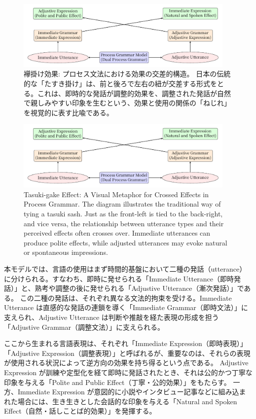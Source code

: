 \documentclass[a4paper,xelatex,ja=standard]{bxjsarticle}
\begin{document}
\ifJPN
  \begin{figure}[htb]\centering\small
    \includegraphics[width=0.95\textwidth]{tasuki-gake.pdf}
    \caption{襷掛け効果: プロセス文法における効果の交差的構造。
    日本の伝統的な「たすき掛け」は、前と後ろで左右の紐が交差する形式をとる。これは、即時的な発話が調整的効果を、調整された発話が自然で親しみやすい印象を生むという、効果と使用の関係の「ねじれ」を視覚的に表す比喩である。
    }\label{fig:tasuki-gake}
  \end{figure}
\else
  \begin{figure}[htb]\centering\small
    \includegraphics[width=0.95\textwidth]{tasuki-gake.pdf}
    \caption{Tasuki-gake Effect: A Visual Metaphor for Crossed Effects in Process Grammar. The diagram illustrates the traditional way of tying a tasuki sash. Just as the front-left is tied to the back-right, and vice versa, the relationship between utterance types and their perceived effects often crosses over. Immediate utterances can produce polite effects, while adjusted utterances may evoke natural or spontaneous impressions.
    }\label{fig:tasuki-gake}
  \end{figure}
\fi

\ifJPN
本モデルでは、言語の使用はまず時間的基盤において二種の発話（utterance）に分けられる。すなわち、即時に発せられる「Immediate Utterance（即時発話）」と、熟考や調整の後に発せられる「Adjustive Utterance（漸次発話）」である。
この二種の発話は、それぞれ異なる文法的拘束を受ける。Immediate Utterance は直感的な発話の連鎖を導く「Immediate Grammar（即時文法）」に支えられ、Adjustive Utterance は判断や推敲を経た表現の形成を担う「Adjustive Grammar（調整文法）」に支えられる。

ここから生まれる言語表現は、それぞれ「Immediate Expression（即時表現）」「Adjustive Expression（調整表現）」と呼ばれるが、重要なのは、それらの表現が使用される状況によって逆方向の効果を持ち得るという点である。
Adjustive Expression が訓練や定型化を経て即時に発話されたとき、それは公的かつ丁寧な印象を与える「Polite and Public Effect（丁寧・公的効果）」をもたらす。
一方、Immediate Expression が意図的に小説やインタビュー記事などに組み込まれた場合には、生き生きとした会話的な印象を与える「Natural and Spoken Effect（自然・話しことば的効果）」を発揮する。
\end{document}
